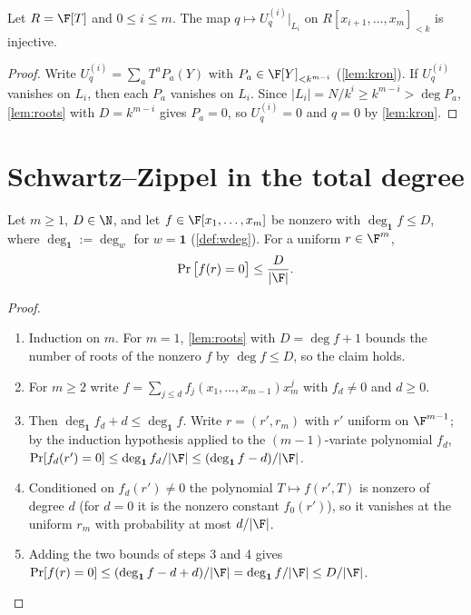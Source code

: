 \begin{lemma}\label{lem:inj}
Let $R=\F[T]$ and $0\le i\le m$. The map $q\mapsto U^{(i)}_q\big|_{L_i}$ on
$R[x_{i+1},\dots,x_m]_{<k}$ is injective.
\end{lemma}

\begin{proof}
Write $U^{(i)}_q=\sum_a T^aP_a(Y)$ with $P_a\in\F[Y]_{<k^{m-i}}$ (\ref{lem:kron}). If
$U^{(i)}_q$ vanishes on $L_i$, then each $P_a$ vanishes on $L_i$. Since
$|L_i|=N/k^i\ge k^{m-i}>\deg P_a$, \ref{lem:roots} with $D=k^{m-i}$ gives $P_a=0$, so
$U^{(i)}_q=0$ and $q=0$ by \ref{lem:kron}.
\end{proof}

\section{Schwartz--Zippel in the total degree}

\begin{lemma}\label{lem:sz-total}
Let $m\ge1$, $D\in\N$, and let $f\in\F[x_1,\dots,x_m]$ be nonzero with
$\deg_{\mathbf 1}f\le D$, where $\deg_{\mathbf 1}:=\deg_w$ for $w=\mathbf 1$ (\ref{def:wdeg}). For a
uniform $r\in\F^m$,
\[
\Pr\big[f(r)=0\big]\le\frac{D}{|\F|}.
\]
\end{lemma}

\begin{proof}\begin{enumerate}
\item Induction on $m$. For $m=1$, \ref{lem:roots} with $D=\deg f+1$ bounds the number of
roots of the nonzero $f$ by $\deg f\le D$, so the claim holds.
\item For $m\ge2$ write $f=\sum_{j\le d}f_j(x_1,\dots,x_{m-1})x_m^j$ with $f_d\ne0$ and $d\ge0$.
\item Then $\deg_{\mathbf 1}f_d+d\le\deg_{\mathbf 1}f$. Write $r=(r',r_m)$ with $r'$ uniform on $\F^{m-1}$; by the induction hypothesis applied to the $(m-1)$-variate polynomial $f_d$, $\Pr[f_d(r')=0]\le\deg_{\mathbf 1}f_d/|\F|\le(\deg_{\mathbf 1}f-d)/|\F|$.
\item Conditioned on $f_d(r')\ne0$ the polynomial $T\mapsto f(r',T)$ is nonzero of degree $d$ (for $d=0$ it is the nonzero constant $f_0(r')$), so it vanishes at the uniform $r_m$ with probability at most $d/|\F|$.
\item Adding the two bounds of steps 3 and 4 gives $\Pr[f(r)=0]\le(\deg_{\mathbf 1}f-d+d)/|\F|=\deg_{\mathbf 1}f/|\F|\le D/|\F|$.
\end{enumerate}\end{proof}


